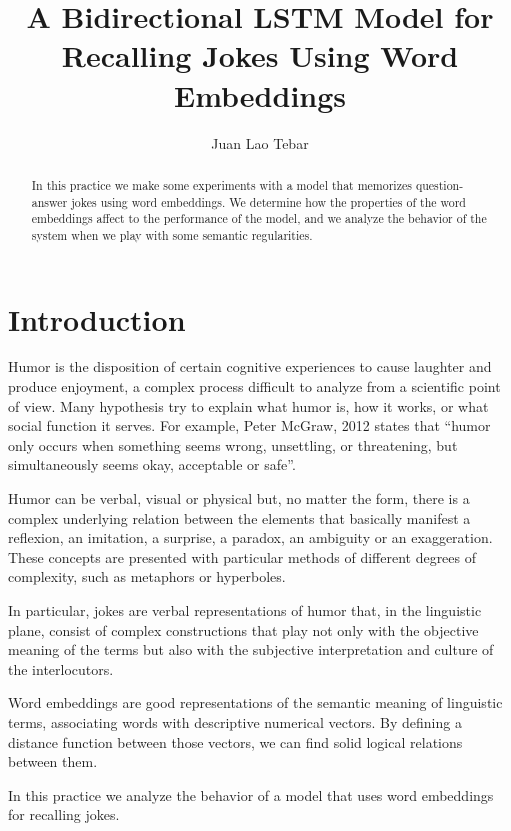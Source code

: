 \documentclass[]{article}
\title{A Bidirectional LSTM Model for Recalling Jokes Using Word Embeddings}
\author{Juan Lao Tebar}
\begin{document}
	\maketitle
	
	\begin{abstract}
		
		In this practice we make some experiments with a model that memorizes question-answer jokes using word embeddings. We determine how the properties of the word embeddings affect to the performance of the model, and we analyze the behavior of the system when we play with some semantic regularities.
		
	\end{abstract}
	
	\section{Introduction}
	
	Humor is the disposition of certain cognitive experiences to cause laughter and produce enjoyment, a complex process difficult to analyze from a scientific point of view. Many hypothesis try to explain what humor is, how it works, or what social function it serves. For example, Peter McGraw, 2012 \cite{mcgraw2012too} states that ``humor only occurs when something seems wrong, unsettling, or threatening, but simultaneously seems okay, acceptable or safe''.
	
	Humor can be verbal, visual or physical but, no matter the form, there is a complex underlying relation between the elements that basically manifest a reflexion, an imitation, a surprise, a paradox, an ambiguity or an exaggeration. These concepts are presented with particular methods of different degrees of complexity, such as metaphors or hyperboles.
	
	In particular, jokes are verbal representations of humor that, in the linguistic plane, consist of complex constructions that play not only with the objective meaning of the terms but also with the subjective interpretation and culture of the interlocutors.
	
	Word embeddings are good representations of the semantic meaning of linguistic terms, associating words with descriptive numerical vectors. By defining a distance function between those vectors, we can find solid logical relations between them. \cite{bengio2003neural}
	
	In this practice we analyze the behavior of a model that uses word embeddings for recalling jokes.
	
\end{document}
